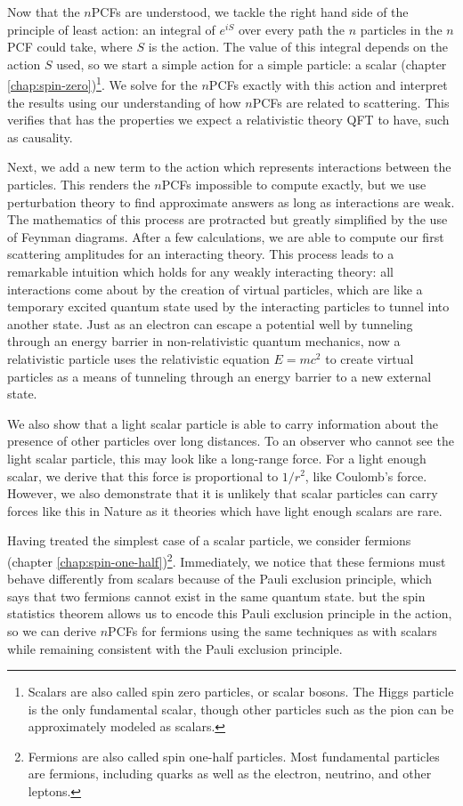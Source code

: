 Now that the $n$PCFs are understood, we tackle the right hand side of the principle of least action: an integral of $e^{iS}$ over every path the $n$ particles in the $n$PCF could take, where $S$ is the action. The value of this integral depends on the action $S$ used, so we start a simple action for a simple particle: a scalar (chapter \ref{chap:spin-zero})\footnote{Scalars are also called spin zero particles, or scalar bosons. The Higgs particle is the only fundamental scalar, though other particles such as the pion can be approximately modeled as scalars.}. We solve for the $n$PCFs exactly with this action and interpret the results using our understanding of how $n$PCFs are related to scattering. This verifies that has the properties we expect a relativistic theory QFT to have, such as causality.

Next, we add a new term to the action which represents interactions between the particles. This renders the $n$PCFs impossible to compute exactly, but we use perturbation theory to find approximate answers as long as interactions are weak. The mathematics of this process are protracted but greatly simplified by the use of Feynman diagrams. After a few calculations, we are able to compute our first scattering amplitudes for an interacting theory. This process leads to a remarkable intuition which holds for any weakly interacting theory: all interactions come about by the creation of virtual particles, which are like a temporary excited quantum state used by the interacting particles to tunnel into another state. Just as an electron can escape a potential well by tunneling through an energy barrier in non-relativistic quantum mechanics, now a relativistic particle uses the relativistic equation $E=mc^2$ to create virtual particles as a means of tunneling through an energy barrier to a new external state.

We also show that a light scalar particle is able to carry information about the presence of other particles over long distances. To an observer who cannot see the light scalar particle, this may look like a long-range force. For a light enough scalar, we derive that this force is proportional to $1/r^2$, like Coulomb's force. However, we also demonstrate that it is unlikely that scalar particles can carry forces like this in Nature as it theories which have light enough scalars are rare.

Having treated the simplest case of a scalar particle, we consider fermions (chapter \ref{chap:spin-one-half})\footnote{Fermions are also called spin one-half particles. Most fundamental particles are fermions, including quarks as well as the electron, neutrino, and other leptons.}. Immediately, we notice that these fermions must behave differently from scalars because of the Pauli exclusion principle, which says that two fermions cannot exist in the same quantum state. but the spin statistics theorem allows us to encode this Pauli exclusion principle in the action, so we can derive $n$PCFs for fermions using the same techniques as with scalars while remaining consistent with the Pauli exclusion principle.

